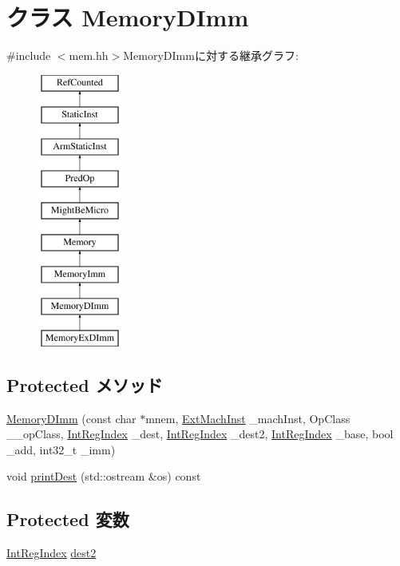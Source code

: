 \hypertarget{classArmISA_1_1MemoryDImm}{
\section{クラス MemoryDImm}
\label{classArmISA_1_1MemoryDImm}
}


{\ttfamily \#include $<$mem.hh$>$}MemoryDImmに対する継承グラフ:\begin{figure}[H]
\begin{center}
\leavevmode
\includegraphics[height=9cm]{classArmISA_1_1MemoryDImm}
\end{center}
\end{figure}
\subsection*{Protected メソッド}
\begin{DoxyCompactItemize}
\item 
\hyperlink{classArmISA_1_1MemoryDImm_a14b02c0b6166e4a44111fb50ae1e489a}{MemoryDImm} (const char $\ast$mnem, \hyperlink{classStaticInst_a5605d4fc727eae9e595325c90c0ec108}{ExtMachInst} \_\-machInst, OpClass \_\-\_\-opClass, \hyperlink{namespaceArmISA_ae64680ba9fb526106829d6bf92fc791b}{IntRegIndex} \_\-dest, \hyperlink{namespaceArmISA_ae64680ba9fb526106829d6bf92fc791b}{IntRegIndex} \_\-dest2, \hyperlink{namespaceArmISA_ae64680ba9fb526106829d6bf92fc791b}{IntRegIndex} \_\-base, bool \_\-add, int32\_\-t \_\-imm)
\item 
void \hyperlink{classArmISA_1_1MemoryDImm_adee5df6e5d6b0c498363aabda42431fa}{printDest} (std::ostream \&os) const 
\end{DoxyCompactItemize}
\subsection*{Protected 変数}
\begin{DoxyCompactItemize}
\item 
\hyperlink{namespaceArmISA_ae64680ba9fb526106829d6bf92fc791b}{IntRegIndex} \hyperlink{classArmISA_1_1MemoryDImm_a0425ad33e25c8198da341b8d8c01fcba}{dest2}
\end{DoxyCompactItemize}



